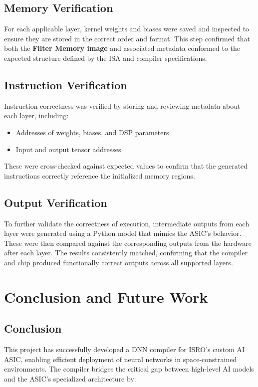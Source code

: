 \documentclass[12pt]{report}
\begin{document}
\section{Memory Verification}

For each applicable layer, kernel weights and biases were saved and inspected to ensure they are stored in the correct order and format. This step confirmed that both the \textbf{Filter Memory image} and associated metadata conformed to the expected structure defined by the ISA and compiler specifications.

\section{Instruction Verification}

Instruction correctness was verified by storing and reviewing metadata about each layer, including:
\begin{itemize}
    \item Addresses of weights, biases, and DSP parameters
    \item Input and output tensor addresses
\end{itemize}
These were cross-checked against expected values to confirm that the generated instructions correctly reference the initialized memory regions.

\section{Output Verification}

To further validate the correctness of execution, intermediate outputs from each layer were generated using a Python model that mimics the ASIC's behavior. These were then compared against the corresponding outputs from the hardware after each layer. The results consistently matched, confirming that the compiler and chip produced functionally correct outputs across all supported layers.

\chapter{Conclusion and Future Work}

\section{Conclusion}
This project has successfully developed a DNN compiler for ISRO's custom AI ASIC, enabling efficient deployment of neural networks in space-constrained environments. The compiler bridges the critical gap between high-level AI models and the ASIC's specialized architecture by:
\end{document}
